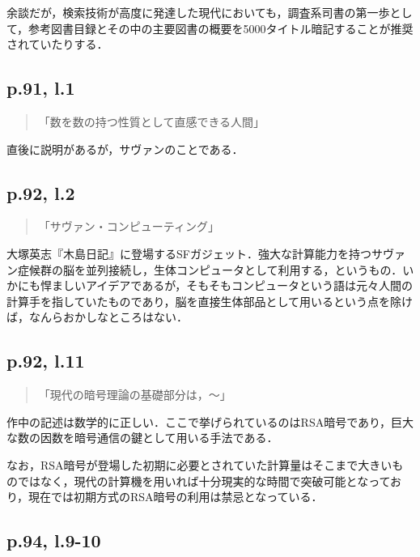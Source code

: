 \documentclass[10pt, a5paper, twoside]{jsarticle}
\theoremstyle{definition}
\begin{document}
			余談だが，検索技術が高度に発達した現代においても，調査系司書の第一歩として，参考図書目録とその中の主要図書の概要を5000タイトル暗記することが推奨されていたりする．

		\subsection{p.91, l.1}

			\begin{quote}

				「数を数の持つ性質として直感できる人間」
				
			\end{quote}

			直後に説明があるが，サヴァンのことである．

		\subsection{p.92, l.2}

			\begin{quote}

				「サヴァン・コンピューティング」
				
			\end{quote}

			大塚英志『木島日記』に登場するSFガジェット．強大な計算能力を持つサヴァン症候群の脳を並列接続し，生体コンピュータとして利用する，というもの．いかにも悍ましいアイデアであるが，そもそもコンピュータという語は元々人間の計算手を指していたものであり，脳を直接生体部品として用いるという点を除けば，なんらおかしなところはない．


		\subsection{p.92, l.11}

			\begin{quote}

				「現代の暗号理論の基礎部分は，〜」

			\end{quote}

			作中の記述は数学的に正しい．ここで挙げられているのはRSA暗号であり，巨大な数の因数を暗号通信の鍵として用いる手法である．

			なお，RSA暗号が登場した初期に必要とされていた計算量はそこまで大きいものではなく，現代の計算機を用いれば十分現実的な時間で突破可能となっており，現在では初期方式のRSA暗号の利用は禁忌となっている．

		\subsection{p.94, l.9-10}
\end{document}
